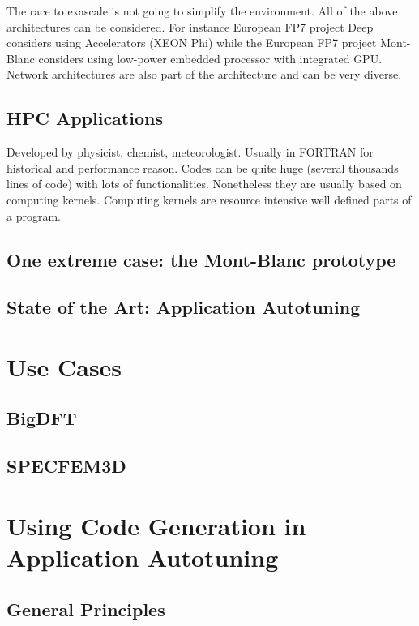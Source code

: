 \documentclass[review]{elsarticle}
\begin{document}
The race to exascale is not going to simplify the environment. All of the
above architectures can be considered. For instance European FP7 project Deep
considers using Accelerators (XEON Phi) while the European FP7 project
Mont-Blanc considers using low-power embedded processor with integrated
GPU. Network architectures are also part of the architecture and can be
very diverse.

  \subsection{HPC Applications}

Developed by physicist, chemist, meteorologist. Usually in FORTRAN for
historical and performance reason. Codes can be quite huge (several
thousands lines of code) with lots of functionalities. Nonetheless they are
usually based on computing kernels. Computing kernels are resource
intensive well defined parts of a program.

  \subsection{One extreme case: the Mont-Blanc prototype}


  \subsection{State of the Art: Application Autotuning}


\section{Use Cases}

  \subsection{BigDFT}


  \subsection{SPECFEM3D}


\section{Using Code Generation in Application Autotuning}

  \subsection{General Principles}
\end{document}
